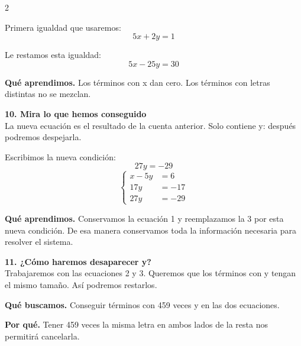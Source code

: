 \documentclass[11pt,a4paper,landscape]{article}
\begin{document}
\begin{multicols*}{2}
\begin{minipage}{\linewidth}
\par\smallskip Primera igualdad que usaremos:
\[5x + 2y = 1\]
\par\smallskip Le restamos esta igualdad:
\[5x - 25y = 30\]
\par\smallskip\textbf{Qué aprendimos.} Los términos con x dan cero. Los términos con letras distintas no se mezclan.
\end{minipage}\par\medskip
\noindent\begin{minipage}{\linewidth}\textbf{10. Mira lo que hemos conseguido}\\[2pt]La nueva ecuación es el resultado de la cuenta anterior. Solo contiene y: después podremos despejarla.
\par\smallskip Escribimos la nueva condición:
\[27y = -29\]
\[\left\{\begin{aligned}x - 5y &= 6\\17y &= -17\\27y &= -29\end{aligned}\right.\]
\par\smallskip\textbf{Qué aprendimos.} Conservamos la ecuación 1 y reemplazamos la 3 por esta nueva condición. De esa manera conservamos toda la información necesaria para resolver el sistema.
\end{minipage}\par\medskip
\noindent\begin{minipage}{\linewidth}\textbf{11. ¿Cómo haremos desaparecer y?}\\[2pt]Trabajaremos con las ecuaciones 2 y 3. Queremos que los términos con y tengan el mismo tamaño. Así podremos restarlos.
\par\smallskip\textbf{Qué buscamos.} Conseguir términos con 459 veces y en las dos ecuaciones.
\par\smallskip\textbf{Por qué.} Tener 459 veces la misma letra en ambos lados de la resta nos permitirá cancelarla.
\par{}\par\smallskip

\end{minipage}
\end{multicols*}
\end{document}
